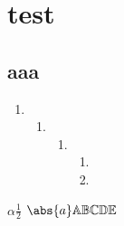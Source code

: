 \documentclass{ctexart}
\begin{document}
\chapter{test}
\section{aaa}
\begin{enumerate}
	\item
	      \begin{enumerate}
		      \item
		            \begin{enumerate}
			            \item
			                  \begin{enumerate}
				                  \item
				                  \item
			                  \end{enumerate}

		            \end{enumerate}

	      \end{enumerate}

\end{enumerate}
\(\alpha \frac{1}{2} \)
\(\abs{a} \mathbb{ABCDE}\)
\end{document}
